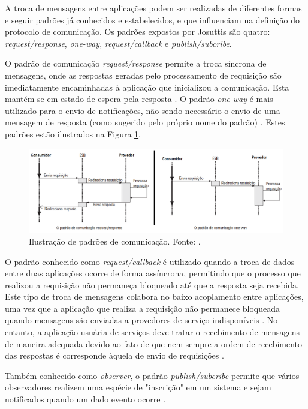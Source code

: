 A troca de mensagens entre aplicações podem ser realizadas de diferentes formas e seguir padrões já conhecidos e estabelecidos, e que influenciam na definição do protocolo de comunicação. Os padrões expostos por Josuttis \cite{josuttis_soa_2007} são quatro: \textit{request/response}, \textit{one-way}, \textit{request/callback} e \textit{publish/subcribe}.

O padrão de comunicação \textit{request/response} permite a troca síncrona de mensagens, onde as respostas geradas pelo processamento de requisição são imediatamente encaminhadas à aplicação que inicializou a comunicação. Esta mantém-se em estado de espera pela resposta \cite{josuttis_soa_2007}. O padrão \textit{one-way} é mais utilizado para o envio de notificações, não sendo necessário o envio de uma mensagem de resposta (como sugerido pelo próprio nome do padrão) \cite{josuttis_soa_2007}. Estes padrões estão ilustrados na Figura \ref{padroes_comunicacao}.

\begin{figure}[htb]
\centering
\includegraphics[scale=0.5]{figuras/padroes_comunicacao.png}
\caption{Ilustração de padrões de comunicação. Fonte: \cite{josuttis_soa_2007}.}
\label{padroes_comunicacao}
\end{figure}

O padrão conhecido como \textit{request/callback} é utilizado quando a troca de dados entre duas aplicações ocorre de forma assíncrona, permitindo que o processo que realizou a requisição não permaneça bloqueado até que a resposta seja recebida. Este tipo de troca de mensagens colabora no baixo acoplamento entre aplicações, uma vez que a aplicação que realiza a requisição não permanece bloqueada quando mensagens são enviadas a provedores de serviço indisponíveis \cite{josuttis_soa_2007}. No entanto, a aplicação usuária de serviços deve tratar o recebimento de mensagens de maneira adequada devido ao fato de que nem sempre a ordem de recebimento das respostas é corresponde àquela de envio de requisições \cite{josuttis_soa_2007}.

Também conhecido como \textit{observer}, o padrão \textit{publish/subcribe} permite que vários observadores realizem uma espécie de "inscrição" em um sistema e sejam notificados quando um dado evento ocorre \cite{josuttis_soa_2007}.

